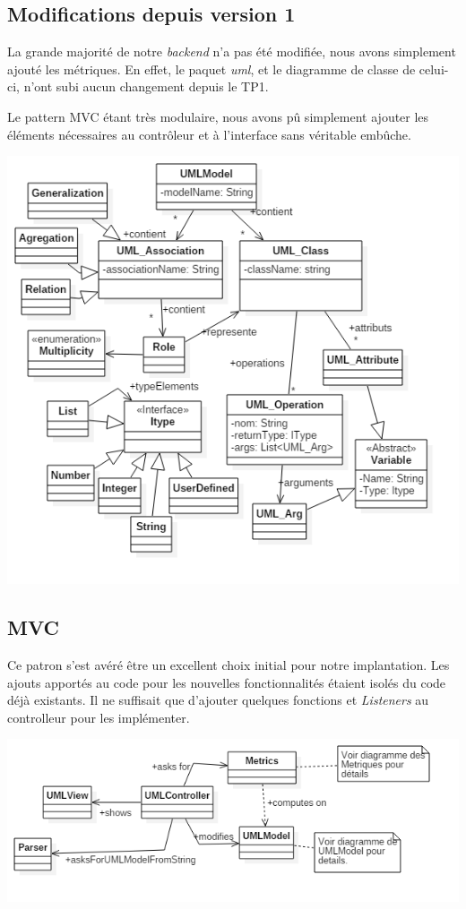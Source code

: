 \documentclass[letter,french]{report}
\begin{document}
  \subsection*{Modifications depuis version 1}

  La grande majorité de notre \emph{backend} n'a pas été modifiée, nous avons
  simplement ajouté les métriques. En effet, le paquet \emph{uml}, et le
  diagramme de classe de celui-ci, n'ont subi aucun changement depuis le TP1.

  Le pattern MVC étant très modulaire, nous avons pû simplement ajouter les
  éléments nécessaires au contrôleur et à l'interface sans véritable embûche.

	\includegraphics[scale=.5]{images/UML_diagram.png}

	\subsection*{MVC}
  Ce patron s'est avéré être un excellent choix initial pour notre implantation.
  Les ajouts apportés au code pour les nouvelles fonctionnalités étaient isolés
  du code déjà existants. Il ne suffisait que d'ajouter quelques fonctions et
  \emph{Listeners} au controlleur pour les implémenter.

	\includegraphics[scale=.5]{images/MVC_diagram.png}
	
\end{document}
